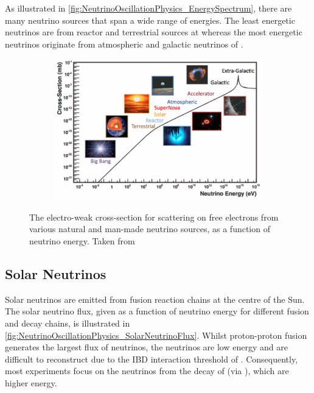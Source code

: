 As illustrated in \autoref{fig:NeutrinoOscillationPhysics_EnergySpectrum}, there are many neutrino sources that span a wide range of energies. The least energetic neutrinos are from reactor and terrestrial sources at  whereas the most energetic neutrinos originate from atmospheric and galactic neutrinos of .

\begin{figure}[h]
  \begin{subfigure}[t]{0.95\textwidth}
    \includegraphics[width=\textwidth, trim={0mm 0mm 0mm 0mm}, clip,page=1]{Figures/Theory/EnergySpectrum.pdf}
  \end{subfigure}
  \caption{The electro-weak cross-section for  scattering on free electrons from various natural and man-made neutrino sources, as a function of neutrino energy. Taken from \cite{Formaggio:2012cpf}}
  \label{fig:NeutrinoOscillationPhysics_EnergySpectrum}
\end{figure}

\subsection{Solar Neutrinos}
\label{subsec:NeutrinoOscillationPhysics_SolarNeutrinos}

Solar neutrinos are emitted from fusion reaction chains at the centre of the Sun. The solar neutrino flux, given as a function of neutrino energy for different fusion and decay chains, is illustrated in \autoref{fig:NeutrinoOscillationPhysics_SolarNeutrinoFlux}. Whilst proton-proton fusion generates the largest flux of neutrinos, the neutrinos are low energy and are difficult to reconstruct due to the IBD interaction threshold of  \cite{Oralbaev_2016}. Consequently, most experiments focus on the neutrinos from the decay of  (via ), which are higher energy.

